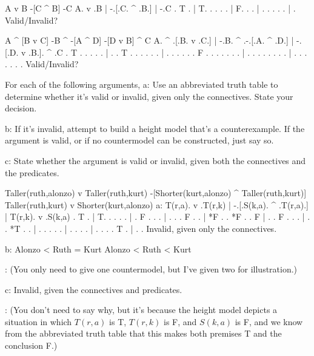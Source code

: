 \argument
 A v B
 -[C ^ B]
\argumentline
 -C
\endargument
	\answer
	\truthtable
	 A. v .B | -.[.C. ^ .B.] | -.C
	\truthtableline
	  . T .  | T. . .   . .  | F.
	  .   .  |  . . .   . .  |  .
	\endtruthtable
	Valid/Invalid?
	\endanswer

\argument
 A ^ [B v C]
 -B ^ -[A ^ D]
\argumentline
 -[D v B] ^ C
\endargument
	\answer
	\truthtable
	 A. ^ .[.B. v .C.] | -.B. ^ .-.[.A. ^ .D.] | -.[.D. v .B.]. ^ .C
	\truthtableline
	  . T . . .   . .  |  . . T . . . .   . .  |  . . .   . . . F . 
	  .   . . .   . .  |  . .   . . . .   . .  |  . . .   . . .   . 
	\endtruthtable
	Valid/Invalid?
	\endanswer

\endproblems

For each of the following arguments,
\list
a: Use an abbreviated truth table to determine whether it's valid or invalid, given only the connectives. State your decision.

b: If it's invalid, attempt to build a height model that's a counterexample. If the argument is valid, or if no countermodel can be constructed, just say so.

c: State whether the argument is valid or invalid, given both the connectives and the predicates.
\endlist

\problems
{}
\argument
 Taller(ruth,alonzo) v Taller(ruth,kurt)
 -[Shorter(kurt,alonzo) ^ Taller(ruth,kurt)]
\argumentline
 Taller(ruth,kurt) v Shorter(kurt,alonzo)
\endargument
	\answerlist
	a:
	\truthtable
	 T(r,a). v .T(r,k) | -.[.S(k,a). ^ .T(r,a).] | T(r,k). v .S(k,a)
	\truthtableline
	       . T .       | T. .      .   .      .  |       . F .
	       .   .       |  . .      . F .      .  |   *F  .   .  *F
	       .   .   F   |  . . F    .   .      .  |       .   .
	   *T  .   .       |  . .      .   .      .  |       .   .
	       .   .       |  . .      .   .   T  .  |       .   .
	\endtruthtable
	Invalid, given only the connectives.

	b:
	\heightmodel
	 Alonzo < Ruth = Kurt
	\endheightmodel
	\OR
	\heightmodel
	 Alonzo < Ruth < Kurt
	\endheightmodel

:	(You only need to give one countermodel, but I've given two for illustration.)

	c: Invalid, given the connectives and predicates.

:	(You don't need to say why, but it's because the height model depicts a situation in which $T(r,a)$ is T, $T(r,k)$ is F, and $S(k,a)$ is F, and we know from the abbreviated truth table that this makes both premises T and the conclusion F.)

